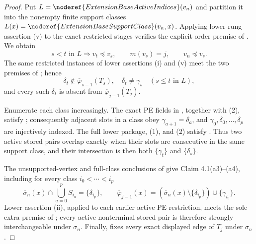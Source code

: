 \begin{proof}
Put \(L=\noderef{ExtensionBaseActiveIndices}(v_n)\) and partition it into
the nonempty finite support classes
\(L(x)=\noderef{ExtensionBaseSupportClass}(v_n,x)\).  Applying lower-rung
assertion (v) to the exact restricted stages verifies the explicit order
premise of .  We obtain
\[
 s<t\text{ in }L\Longrightarrow v_t\preceq v_s,
 \qquad m(v_s)=j,
 \qquad v_n\preceq v_s.                                    \tag{1}
\]
The same restricted instances of lower assertions (i) and (v) meet the
two premises of ; hence
\[
 \delta_t\notin\overline\varphi_{s-1}(T_s),\quad
 \delta_t\ne\gamma_s\quad(s\leq t\text{ in }L),             \tag{2}
\]
and every such \(\delta_t\) is absent from
\(\overline\varphi_{j-1}(T_j)\).

Enumerate each class increasingly.  The exact PE fields in
, together with (2), satisfy
; consequently adjacent slots
in a class obey \(\gamma_{a+1}=\delta_a\), and
\(\gamma_0,\delta_0,\ldots,\delta_p\) are injectively indexed.  The
full lower package, (1), and (2) satisfy
.  Thus two active stored pairs
overlap exactly when their slots are consecutive in the same support
class, and their intersection is then both
\(\{\gamma_t\}\) and \(\{\delta_s\}\).                     

The unsupported-vertex and full-class conclusions of
 give Claim 4.1(a3)--(a4),
including for every class \(i_0<\cdots<i_p\)
\[
 \overline\sigma_n(x)\cap\bigcup_{a=0}^p S_{i_a}
      =\{\delta_{i_p}\},
 \qquad
 \overline\varphi_{j-1}(x)
      =(\overline\sigma_n(x)\setminus\{\delta_{i_p}\})
          \cup\{\gamma_{i_0}\}.                            \tag{4}
\]
Lower assertion (ii), applied to each earlier active PE restriction,
meets the sole extra premise of
; every active
nonterminal stored pair is therefore strongly interchangeable under
\(\sigma_n\).  Finally, 
fixes every exact displayed edge of \(T_j\) under \(\sigma_n\).


\end{proof}
